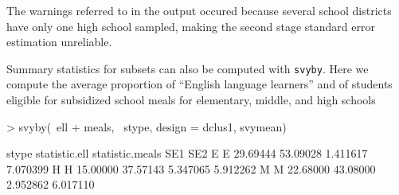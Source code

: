 \documentclass{article}
\begin{document}
The warnings referred to in the output occured because several
school districts have only one high school sampled, making the second
stage standard error estimation unreliable.

Summary statistics for subsets can also be computed with
\texttt{svyby}. Here we compute the average proportion of ``English
language learners'' and of students eligible for subsidized school
meals for elementary, middle, and high schools
\begin{Schunk}
\begin{Sinput}
> svyby(~ell + meals, ~stype, design = dclus1, svymean)
\end{Sinput}
\begin{Soutput}
  stype statistic.ell statistic.meals      SE1      SE2
E     E      29.69444        53.09028 1.411617 7.070399
H     H      15.00000        37.57143 5.347065 5.912262
M     M      22.68000        43.08000 2.952862 6.017110
\end{Soutput}
\end{Schunk}
\end{document}

